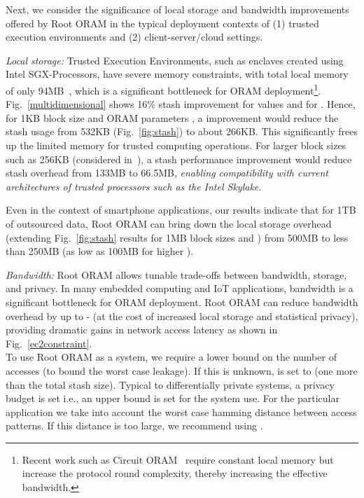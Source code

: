 \documentclass[USenglish,oneside,twocolumn]{article}
\makeatletter
\newcommand{\ourprotocol}{Root ORAM}
\let\origsubsection\subsection
\renewcommand\subsection{\@ifstar{\starsubsection}{\nostarsubsection}}
\newcommand\nostarsubsection[1]
{\subsectionprelude\origsubsection{#1}\subsectionpostlude}
\newcommand\starsubsection[1]
{\subsectionprelude\origsubsection*{#1}\subsectionpostlude}
\newcommand\subsectionprelude{\vspace{-1.5em}}
\newcommand\subsectionpostlude{\vspace{-1em}}
\makeatother
\begin{document}
\subsection{Practical Impact}
\label{subsec:usability}



Next, we consider the significance of local storage and bandwidth improvements offered by \ourprotocol{} in the typical deployment contexts of (1) trusted execution environments and (2) client-server/cloud settings. 

\emph{Local storage:} Trusted Execution Environments, such as enclaves created using Intel SGX-Processors, have severe memory constraints, with total local memory of only 94MB~\cite{ohrimenko2016oblivious}, which is a significant bottleneck for ORAM deployment\footnote{Recent work such as Circuit ORAM~\cite{circuitoram} require constant local memory but increase the protocol round complexity, thereby increasing the effective bandwidth.}. Fig.~\ref{multidimensional} shows 16\% stash improvement for  values and  for . Hence, for 1KB block size and ORAM parameters , a  improvement would reduce the stash usage from 532KB (Fig.~\ref{fig:stash}) to about 266KB. 
This significantly frees up the limited memory for 
trusted computing operations. 
For larger block sizes such as 256KB (considered in~\cite{naveedpractical}), a  stash performance improvement would reduce stash overhead from 133MB to 66.5MB, 
\emph{enabling compatibility with current architectures of trusted processors such as the Intel Skylake}.

Even in the context of smartphone applications, our results indicate that for 1TB of outsourced data, Root ORAM can bring down the local storage overhead (extending Fig.~\ref{fig:stash} results for 1MB block sizes and ) from 500MB to less than  250MB (as low as 100MB for higher ).

\emph{Bandwidth:} \ourprotocol{} allows tunable trade-offs between bandwidth, storage, and privacy. In many embedded computing and IoT applications, bandwidth is a significant bottleneck for ORAM deployment. \ourprotocol{} can reduce bandwidth overhead by up to - (at the cost of increased local storage and statistical privacy), providing dramatic gains in network access latency as shown in Fig.~\ref{ec2constraint}.\\

\vspace{-2em}
\subsection{Choosing parameters}\label{subsec:choose}
To use \ourprotocol{} as a system, we require a lower bound on the number of accesses  (to bound the worst case  leakage). If this is unknown,  is set to  (one more than the total stash size). Typical to differentially private systems, a privacy budget is set i.e., an upper bound  is set for the system use. For the particular application we take into account the worst case hamming distance between access patterns. If this distance is too large, we recommend using .
\end{document}
